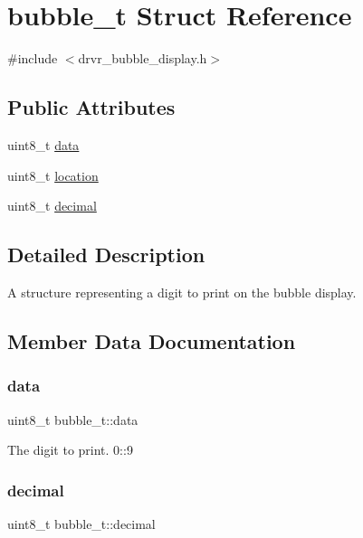 \hypertarget{structbubble__t}{}\section{bubble\+\_\+t Struct Reference}
\label{structbubble__t}


{\ttfamily \#include $<$drvr\+\_\+bubble\+\_\+display.\+h$>$}

\subsection*{Public Attributes}
\begin{DoxyCompactItemize}
\item 
uint8\+\_\+t \mbox{\hyperlink{structbubble__t_ae19dfe83e550c876f86de29aa0b37996}{data}}
\item 
uint8\+\_\+t \mbox{\hyperlink{structbubble__t_ab471acaaeb2ef04b214dbb4ca1184ab3}{location}}
\item 
uint8\+\_\+t \mbox{\hyperlink{structbubble__t_a979f8bd43daf5a02c778322b6658bbda}{decimal}}
\end{DoxyCompactItemize}


\subsection{Detailed Description}
A structure representing a digit to print on the bubble display. 

\subsection{Member Data Documentation}
\mbox{\label{structbubble__t_ae19dfe83e550c876f86de29aa0b37996}} 
\subsubsection{\texorpdfstring{data}{data}}
{\footnotesize\ttfamily uint8\+\_\+t bubble\+\_\+t\+::data}

The digit to print. 0\+::9 \mbox{\label{structbubble__t_a979f8bd43daf5a02c778322b6658bbda}} 
\subsubsection{\texorpdfstring{decimal}{decimal}}
{\footnotesize\ttfamily uint8\+\_\+t bubble\+\_\+t\+::decimal}

